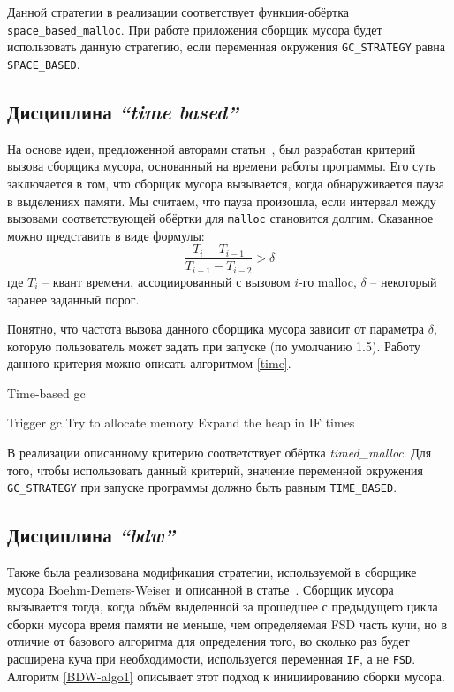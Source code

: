 Данной стратегии в реализации соответствует функция-обёртка \texttt{space\_based\_malloc}.
При работе приложения сборщик мусора будет использовать данную стратегию,
если переменная окружения \texttt{GC\_STRATEGY} равна \texttt{SPACE\_BASED}.


\subsection{Дисциплина \emph{``time based''}}

На основе идеи, предложенной авторами статьи~\cite{microphase}, был разработан критерий
вызова сборщика мусора, основанный на времени работы программы. Его суть заключается
в том, что сборщик мусора вызывается, когда обнаруживается пауза в выделениях памяти.
Мы считаем, что пауза произошла, если интервал между вызовами соответствующей обёртки для \texttt{malloc}
становится долгим. Сказанное можно представить в виде формулы:
    $$\frac {T_i - T_{i-1}} {T_{i-1} - T_{i-2}} > \delta $$ 
    где $T_{i}$ -- квант времени, ассоциированный с вызовом $i$-го malloc, $\delta$ -- некоторый 
    заранее заданный порог.

Понятно, что частота вызова данного сборщика мусора зависит от параметра $\delta$, 
которую пользователь может задать при запуске (по умолчанию 1.5).
Работу данного критерия можно описать алгоритмом \ref{time}. 

\begin{algorithm}
\caption{Time-based gc}
\label{time}
\begin{algorithmic}[3]
    \State Trigger gc
\EndIf
\State Try to allocate memory
    \State Expand the heap in IF times
\EndIf

\end{algorithmic}
\end{algorithm}

В реализации описанному критерию соответствует обёртка \emph{timed\_malloc}. Для того, чтобы использовать
данный критерий, значение переменной окружения \texttt{GC\_STRATEGY} при запуске программы должно быть 
равным \texttt{TIME\_BASED}.

\subsection{Дисциплина \emph{``bdw''}} 

Также была реализована модификация стратегии, используемой в сборщике мусора 
Boehm-Demers-Weiser и описанной в статье~\cite{BDW}. 
Сборщик мусора вызывается тогда, когда объём выделенной за прошедшее с предыдущего
цикла сборки мусора
время памяти не меньше, чем определяемая FSD часть кучи, но в отличие от 
базового алгоритма для определения того, во сколько раз будет расширена куча 
при необходимости, используется переменная \texttt{IF}, а не \texttt{FSD}. Алгоритм \ref{BDW-algo1}
описывает этот подход к инициированию сборки мусора. 

